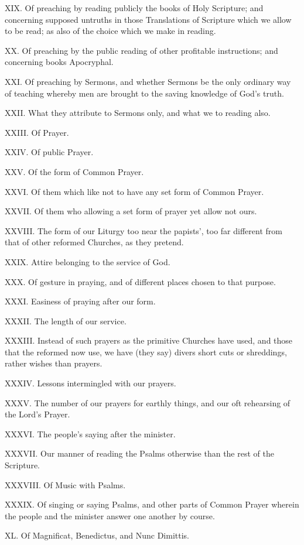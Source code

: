 XIX. Of preaching by reading publicly the books of Holy Scripture; and concerning supposed untruths in those Translations of Scripture which we allow to be read; as also of the choice which we make in reading.  

XX. Of preaching by the public reading of other profitable instructions; and concerning books Apocryphal.

XXI. Of preaching by Sermons, and whether Sermons be the only ordinary way of teaching whereby men are brought to the saving knowledge of God’s truth.

XXII. What they attribute to Sermons only, and what we to reading also.

XXIII. Of Prayer.

XXIV. Of public Prayer.

XXV. Of the form of Common Prayer.

XXVI. Of them which like not to have any set form of Common Prayer.

XXVII. Of them who allowing a set form of prayer yet allow not ours.

XXVIII. The form of our Liturgy too near the papists’, too far different from that of other reformed Churches, as they pretend.

XXIX. Attire belonging to the service of God.

XXX. Of gesture in praying, and of different places chosen to that purpose.

XXXI. Easiness of praying after our form.

XXXII. The length of our service.

XXXIII. Instead of such prayers as the primitive Churches have used, and those that the reformed now use, we have (they say) divers short cuts or shreddings, rather wishes than prayers.

XXXIV. Lessons intermingled with our prayers.

XXXV. The number of our prayers for earthly things, and our oft rehearsing of the Lord’s Prayer.

XXXVI. The people’s saying after the minister.

XXXVII. Our manner of reading the Psalms otherwise than the rest of the Scripture.

XXXVIII. Of Music with Psalms.

XXXIX. Of singing or saying Psalms, and other parts of Common Prayer wherein the people and the minister answer one another by course.

XL. Of Magnificat, Benedictus, and Nunc Dimittis.

